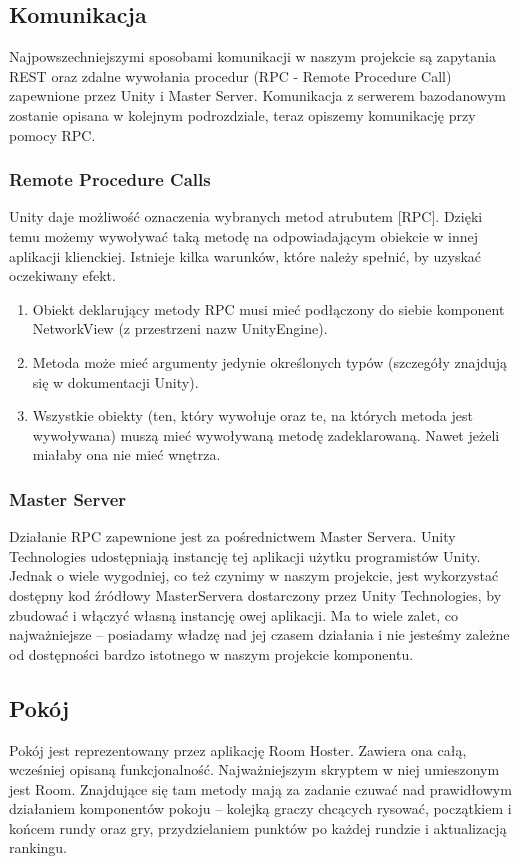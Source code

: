 \subsection{Komunikacja}
Najpowszechniejszymi sposobami komunikacji w naszym projekcie są zapytania REST oraz zdalne wywołania procedur (RPC - Remote Procedure Call) zapewnione przez Unity i Master Server. 
Komunikacja z serwerem bazodanowym zostanie opisana w kolejnym podrozdziale, teraz opiszemy komunikację przy pomocy RPC.

\subsubsection{Remote Procedure Calls}
Unity daje możliwość oznaczenia wybranych metod atrubutem [RPC]. Dzięki temu możemy wywoływać taką metodę na odpowiadającym obiekcie w innej aplikacji klienckiej. Istnieje kilka warunków, które należy spełnić, by uzyskać oczekiwany efekt.
\begin{enumerate}
    \item Obiekt deklarujący metody RPC musi mieć podłączony do siebie komponent NetworkView (z przestrzeni nazw UnityEngine).
    \item Metoda może mieć argumenty jedynie określonych typów (szczegóły znajdują się w dokumentacji Unity).
    \item Wszystkie obiekty (ten, który wywołuje oraz te, na których metoda jest wywoływana) muszą mieć wywoływaną metodę zadeklarowaną. Nawet jeżeli miałaby ona nie mieć wnętrza.
\end{enumerate}

\subsubsection{Master Server}
Działanie RPC zapewnione jest za pośrednictwem Master Servera. Unity Technologies udostępniają instancję tej aplikacji użytku programistów Unity. Jednak o wiele wygodniej, co też czynimy w naszym projekcie, jest wykorzystać dostępny kod źródłowy MasterServera dostarczony przez Unity Technologies, by zbudować i włączyć własną instancję owej aplikacji. Ma to wiele zalet, co najważniejsze – posiadamy władzę nad jej czasem działania i nie jesteśmy zależne od dostępności bardzo istotnego w naszym projekcie komponentu.

\subsection{Pokój}
Pokój jest reprezentowany przez aplikację Room Hoster. Zawiera ona całą, wcześniej opisaną funkcjonalność. Najważniejszym skryptem w niej umieszonym jest Room. Znajdujące się tam metody mają za zadanie czuwać nad prawidłowym działaniem komponentów pokoju – kolejką graczy chcących rysować, początkiem i końcem rundy oraz gry, przydzielaniem punktów po każdej rundzie i aktualizacją rankingu.

